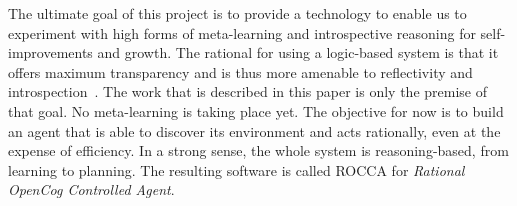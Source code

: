\documentclass[runningheads]{llncs}
\begin{document}
The ultimate goal of this project is to provide a technology to enable
us to experiment with high forms of meta-learning and introspective
reasoning for self-improvements and growth.  The rational for using a
logic-based system is that it offers maximum transparency and is thus
more amenable to reflectivity and introspection~\cite{Schmidhuber2003,
  Goertzel2014EGI1}.  The work that is described in this paper is only
the premise of that goal.  No meta-learning is taking place yet.  The
objective for now is to build an agent that is able to discover its
environment and acts rationally, even at the expense of efficiency.
In a strong sense, the whole system is reasoning-based, from learning
to planning.  The resulting software is called ROCCA for
\emph{Rational OpenCog Controlled Agent}.








\end{document}
